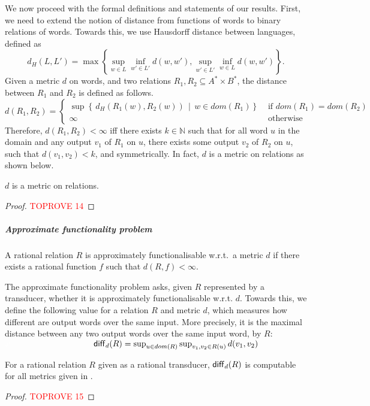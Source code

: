 \documentclass[a4paper,UKenglish,cleveref, autoref, thm-restate,authorcolumns, colorlinks]{lipics-v2021}
\newcommand\dom{\mathit{dom}}
\begin{document}
{We now proceed with the formal definitions and statements of our results. First, we need to extend the notion of distance from functions of words to binary relations of words. 
Towards this, we use Hausdorff distance between languages, defined as \[
d_H(L,L') = \max \left\{ \sup_{w \in L} \inf_{w' \in L'} d(w,w'), \sup_{w' \in L'} \inf_{w \in L} d(w,w') \right\}.
\]
Given a metric $d$ on words, and two relations $R_1,R_2\subseteq A^*\times B^*$, the distance between $R_1$ and $R_2$ is defined as follows.
$$d(R_1,R_2) = \begin{cases} \sup \left \{\,  d_H(R_1(w), R_2(w)) \,\mid\,  w \in \dom(R_1) \right \} & \text{ if $\dom(R_1) = \dom(R_2)$} \\
 \infty & \text{ otherwise } 
 \end{cases}$$
Therefore, $d(R_1,R_2)<\infty$ iff there exists $k\in\mathbb{N}$ such that for all word $u$ in the domain and any output $v_1$ of $R_1$ on $u$, there exists some output $v_2$ of $R_2$ on $u$, such that $d(v_1,v_2)<k$, and symmetrically. In fact, $d$ is a metric on relations as shown below. 
    
\begin{proposition}\label{prop:metricrelations}
    $d$ is a metric on relations.
\end{proposition}
\begin{proof}\textcolor{red}{TOPROVE 14}\end{proof}

\subparagraph*{Approximate functionality problem}

\begin{definition}\label{def:approxfunc}
    A rational relation $R$ is approximately functionalisable w.r.t.~a metric $d$ if there exists a rational function $f$  such that $d(R,f)<\infty$. 
\end{definition}
The approximate functionality problem asks, given $R$ represented by a transducer, whether it is approximately functionalisable w.r.t. $d$. Towards this, we define the following value for a relation $R$ and metric $d$, which measures how different are output words over the same input. More precisely, it is the maximal distance between any two output words over the same input word, by $R$:
\\$
\textcolor{white}{x}~~~~~~~~~~~~~~~~~~~~~~~~~~~~~~{\sf diff}_d(R) = \sup_{u\in dom(R)} \sup_{v_1,v_2\in R(u)} d(v_1,v_2)
$

\begin{lemma}\label{lem:diffcomp}
  For a rational relation $R$ given as a rational transducer, ${\sf diff}_d(R)$ is computable for all metrics given in .
\end{lemma}
\begin{proof}\textcolor{red}{TOPROVE 15}\end{proof}

}
\end{document}
